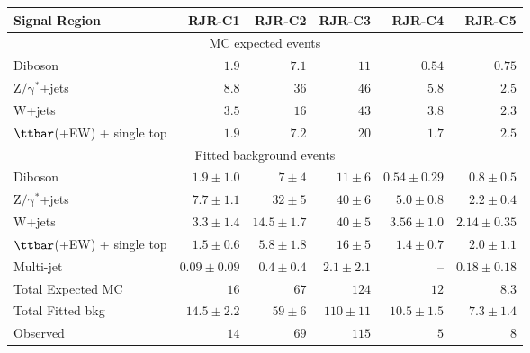 \begin{table}[tbp]
\begin{center}
\begin{tabular}{|lrrrrr|}
\hline
Signal Region & \textbf{ RJR-C1 } & \textbf{ RJR-C2 } & \textbf{ RJR-C3 } & \textbf{ RJR-C4 } & \textbf{ RJR-C5 } \\
\hline
\multicolumn{6}{|c|}{MC expected events} \\ \hline
Diboson &  $1.9$               &  $7.1$               &  $11$               &  $0.54$               &  $0.75$               \\
$\mathrm{Z/\gamma^{*}}$+jets &  $8.8$               &  $36$               &  $46$               &  $5.8$               &  $2.5$               \\
W+jets &  $3.5$               &  $16$               &  $43$               &  $3.8$               &  $2.3$               \\
$\ttbar$(+EW) + single top &  $1.9$               &  $7.2$               &  $20$               &  $1.7$               &  $2.5$               \\
\hline
\multicolumn{6}{|c|}{Fitted background events} \\ \hline
Diboson & $1.9 \pm 1.0$ & $7 \pm 4$ & $11 \pm 6$ & $0.54 \pm 0.29$ & $0.8 \pm 0.5$ \\
$\mathrm{Z/\gamma^{*}}$+jets & $7.7 \pm 1.1$ & $32 \pm 5$ & $40 \pm 6$ & $5.0 \pm 0.8$ & $2.2 \pm 0.4$ \\
W+jets & $3.3 \pm 1.4$ & $14.5 \pm 1.7$ & $40 \pm 5$ & $3.56 \pm 1.0$ & $2.14 \pm 0.35$ \\
$\ttbar$(+EW) + single top & $1.5 \pm 0.6$ & $5.8 \pm 1.8$ & $16 \pm 5$ & $1.4 \pm 0.7$ & $2.0 \pm 1.1$ \\
Multi-jet & $0.09 \pm 0.09$ & $0.4 \pm 0.4$ & $2.1 \pm 2.1$ & -- & $0.18 \pm 0.18$ \\
\hline
Total Expected MC &  $16$               &  $67$               &  $124$               &  $12$               &  $8.3$               \\
\hline
Total Fitted bkg & $14.5 \pm 2.2$ & $59 \pm 6$ & $110 \pm 11$ & $10.5 \pm 1.5$ & $7.3 \pm 1.4$ \\
\hline
Observed &  $14$                     &  $69$                     &  $115$                     &  $5$                     &  $8$                     \\
\hline



\end{tabular}
\end{center}
\end{table}
